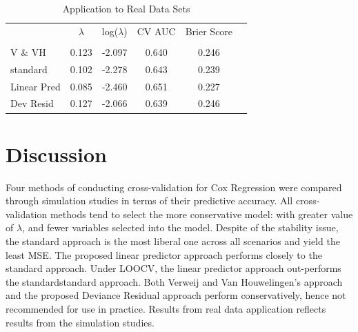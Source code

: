 \begin{table}[h]
\centering
\caption{Application to Real Data Sets}
\label{my-label}
\begin{tabular}{lccccc}
\toprule
						& $\lambda$ & log($\lambda$) & CV AUC & Brier Score \\ 
						\cline{2-5} \\ 
						V $\&$ VH& 0.123 & -2.097 & 0.640 & 0.246\\
						standard & 0.102 & -2.278 & 0.643& 0.239\\
						Linear Pred &0.085 & -2.460 & 0.651&  0.227\\
						Dev Resid & 0.127& -2.066 & 0.639& 0.246\\ 
						\bottomrule
\end{tabular}
\end{table}

\section{Discussion}

\par Four methods of conducting cross-validation for Cox Regression were compared through simulation studies in terms of their predictive accuracy. All cross-validation methods tend to select the more conservative model: with greater value of $\lambda$, and fewer variables selected into the model. Despite of the stability issue, the standard approach is the most liberal one across all scenarios and yield the least MSE. The proposed linear predictor approach performs closely to the standard approach. Under LOOCV, the linear predictor approach out-performs the standardstandard approach. Both Verweij and Van Houwelingen's approach and the proposed Deviance Residual approach perform conservatively, hence not recommended for use in practice. Results from real data application reflects results from the simulation studies.



